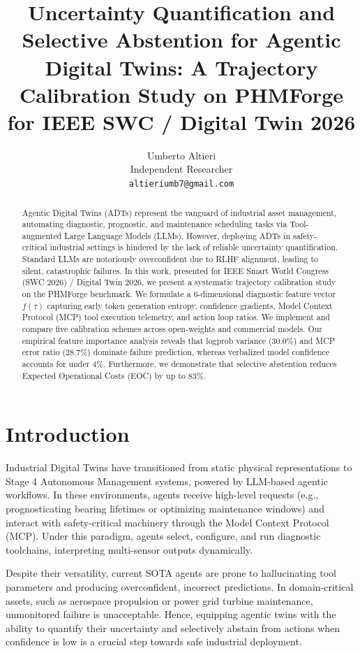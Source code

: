 \documentclass{article}
\title{Uncertainty Quantification and Selective Abstention for Agentic Digital Twins: A Trajectory Calibration Study on PHMForge for IEEE SWC / Digital Twin 2026}
\author{%
  Umberto Altieri \\
  Independent Researcher \\
  \texttt{altieriumb7@gmail.com} \\
}
\begin{document}
\maketitle

\begin{abstract}
Agentic Digital Twins (ADTs) represent the vanguard of industrial asset management, automating diagnostic, prognostic, and maintenance scheduling tasks via Tool-augmented Large Language Models (LLMs). However, deploying ADTs in safety-critical industrial settings is hindered by the lack of reliable uncertainty quantification. Standard LLMs are notoriously overconfident due to RLHF alignment, leading to silent, catastrophic failures. In this work, presented for IEEE Smart World Congress (SWC 2026) / Digital Twin 2026, we present a systematic trajectory calibration study on the PHMForge benchmark. We formulate a 6-dimensional diagnostic feature vector $f(\tau)$ capturing early token generation entropy, confidence gradients, Model Context Protocol (MCP) tool execution telemetry, and action loop ratios. We implement and compare five calibration schemes across open-weights and commercial models. Our empirical feature importance analysis reveals that logprob variance ($30.0\%$) and MCP error ratio ($28.7\%$) dominate failure prediction, whereas verbalized model confidence accounts for under $4\%$. Furthermore, we demonstrate that selective abstention reduces Expected Operational Costs (EOC) by up to $83\%$.
\end{abstract}

\section{Introduction}
Industrial Digital Twins have transitioned from static physical representations to Stage 4 Autonomous Management systems, powered by LLM-based agentic workflows. In these environments, agents receive high-level requests (e.g., prognosticating bearing lifetimes or optimizing maintenance windows) and interact with safety-critical machinery through the Model Context Protocol (MCP). Under this paradigm, agents select, configure, and run diagnostic toolchains, interpreting multi-sensor outputs dynamically.

Despite their versatility, current SOTA agents are prone to hallucinating tool parameters and producing overconfident, incorrect predictions. In domain-critical assets, such as aerospace propulsion or power grid turbine maintenance, unmonitored failure is unacceptable. Hence, equipping agentic twins with the ability to quantify their uncertainty and selectively abstain from actions when confidence is low is a crucial step towards safe industrial deployment.
\end{document}
